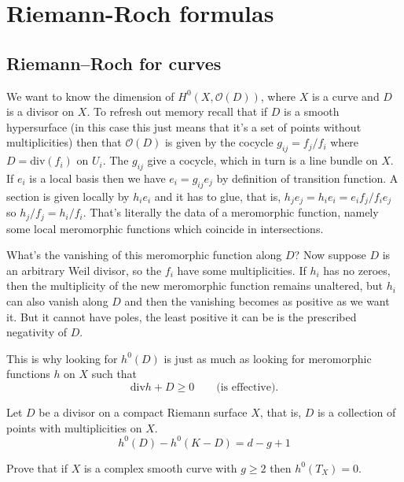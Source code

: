 \section{Riemann-Roch formulas}
\label{section-riemann-roch}

\subsection{Riemann--Roch for curves}
\label{subsection-riemann-roch-curves}

\noindent
We want to know the dimension of
$H^0(X,\mathcal{O}(D))$,
where $X$ is a curve and $D$ is a divisor on
$X$.
To refresh out memory recall that if $D$ is a
smooth hypersurface
(in this case this just means that it's a set
of points
without multiplicities)
then that $\mathcal{O}(D)$ is given by the
cocycle
$g_{ij}=f_j/f_i$ where $D=\text{div}(f_i)$ on
$U_i$.
The $g_{ij}$ give a cocycle, which in turn is
a line bundle on $X$.
If $e_i$ is a local basis then we have
$e_i=g_{ij}e_j$
by definition of transition function.
A section is given locally by $h_ie_i$ and it
has to glue,
that is, $h_je_j=h_ie_i=e_if_j/f_ie_j$
so $h_j/f_j=h_i/f_i$.
That's literally the data of a meromorphic
function,
namely some local meromorphic functions which
coincide in intersections.

What's the vanishing of this meromorphic
function along $D$?
Now suppose $D$ is an arbitrary Weil divisor,
so the $f_i$ have some multiplicities.
If $h_i$ has no zeroes, then the multiplicity
of the new
meromorphic function remains unaltered, but
$h_i$ can also vanish
along $D$ and then the vanishing becomes as
positive as we want it.
But it cannot have poles, the least positive
it can be is
the prescribed negativity of $D$.

This is why looking for $h^0(D)$ is just as
much as looking for
meromorphic functions $h$ on $X$ such that
$$
\text{div}h + D \geq 0\qquad \text{(is
effective).}
$$



\begin{theorem}
\label{theorem-Riemann-Roch-for-curves}
Let $D$ be a divisor on a compact Riemann
surface $X$, that is, $D$ is a
collection of points with multiplicities on
$X$.
\begin{equation}
\label{equation-riema-roch-riema-surfa}
h^0(D)-h^0(K-D)=d-g+1
\end{equation}
\end{theorem}

\begin{exercise}
\label{exercise-no-holom-vecto-field-g}
Prove that if $X$ is a complex smooth curve
with $g\geq 2$ then $h^0(T_X)=0$.
\end{exercise}

